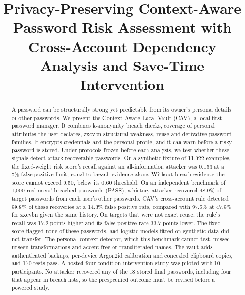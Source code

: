 \documentclass[conference]{IEEEtran}
\begin{document}
\title{Privacy-Preserving Context-Aware Password Risk Assessment with Cross-Account Dependency Analysis and Save-Time Intervention}

\author{
}

\maketitle

\begin{abstract}
A password can be structurally strong yet predictable from its owner's personal details or other passwords. We present the Context-Aware Local Vault (CAV), a local-first password manager. It combines k-anonymity breach checks, coverage of personal attributes the user declares, zxcvbn structural weakness, reuse and derivative-password families. It encrypts credentials and the personal profile, and it can warn before a risky password is stored. Under protocols frozen before each analysis, we test whether these signals detect attack-recoverable passwords. On a synthetic fixture of 11,022 examples, the fixed-weight risk score's recall against an all-information attacker was 0.153 at a 5\% false-positive limit, equal to breach evidence alone. Without breach evidence the score cannot exceed 0.50, below its 0.60 threshold. On an independent benchmark of 1,000 real users' breached passwords (PASS), a history attacker recovered 48.9\% of target passwords from each user's other passwords. CAV's cross-account rule detected 99.8\% of these recoveries at a 14.3\% false-positive rate, compared with 97.5\% at 47.9\% for zxcvbn given the same history. On targets that were not exact reuse, the rule's recall was 17.2 points higher and its false-positive rate 33.7 points lower. The fixed score flagged none of these passwords, and logistic models fitted on synthetic data did not transfer. The personal-context detector, which this benchmark cannot test, missed unseen transformations and accent-free or transliterated names. The vault adds authenticated backups, per-device Argon2id calibration and concealed clipboard copies, and 170 tests pass. A hosted four-condition intervention study was piloted with 10 participants. No attacker recovered any of the 18 stored final passwords, including four that appear in breach lists, so the prespecified outcome must be revised before a powered study.
\end{abstract}
\end{document}
